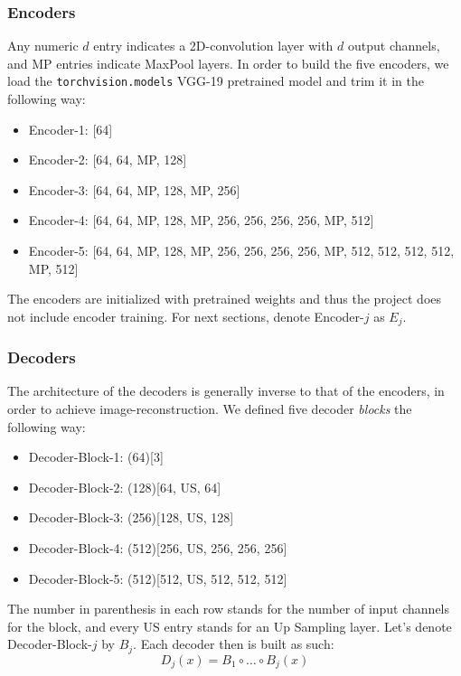 \subsubsection{Encoders}
Any numeric $d$ entry indicates a 2D-convolution layer with $d$ output channels, and MP entries indicate MaxPool layers. In order to build the five encoders, we load the \texttt{torchvision.models} VGG-19 pretrained model and trim it in the following way:
\begin{itemize}
	\item Encoder-1: [64]
	\item Encoder-2: [64, 64, MP, 128]
	\item Encoder-3: [64, 64, MP, 128, MP, 256]
	\item Encoder-4: [64, 64, MP, 128, MP, 256, 256, 256, 256, MP, 512]
	\item Encoder-5: [64, 64, MP, 128, MP, 256, 256, 256, 256, MP, 512, 512, 512, 512, MP, 512]
\end{itemize}
The encoders are initialized with pretrained weights and thus the project does not include encoder training. For next sections, denote Encoder-$j$ as $E_j$.

\subsubsection{Decoders}
The architecture of the decoders is generally inverse to that of the encoders, in order to achieve image-reconstruction. We defined five decoder \textit{blocks} the following way:
\begin{itemize}
	\item Decoder-Block-1: (64)[3]
	\item Decoder-Block-2: (128)[64, US, 64]
	\item Decoder-Block-3: (256)[128, US, 128]
	\item Decoder-Block-4: (512)[256, US, 256, 256, 256]
	\item Decoder-Block-5: (512)[512, US, 512, 512, 512]
\end{itemize}
The number in parenthesis in each row stands for the number of input channels for the block, and every US entry stands for an Up Sampling layer. Let's denote Decoder-Block-$j$ by $B_j$. Each decoder then is built as such:
\begin{equation}\label{eq:decoder}
	D_j(x) = B_1 \circ \dots \circ B_j (x)
\end{equation}

